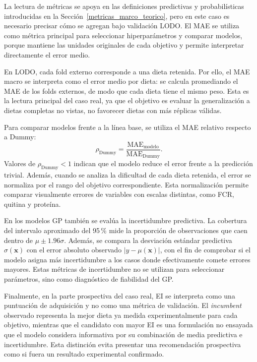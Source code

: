 La lectura de métricas se apoya en las definiciones predictivas y probabilísticas introducidas en la Sección~\ref{metricas_marco_teorico}, pero en este caso es necesario precisar cómo se agregan bajo validación LODO. El MAE se utiliza como métrica principal para seleccionar hiperparámetros y comparar modelos, porque mantiene las unidades originales de cada objetivo y permite interpretar directamente el error medio.

En LODO, cada fold externo corresponde a una dieta retenida. Por ello, el MAE macro se interpreta como el error medio por dieta: se calcula promediando el MAE de los folds externos, de modo que cada dieta tiene el mismo peso. Esta es la lectura principal del caso real, ya que el objetivo es evaluar la generalización a dietas completas no vistas, no favorecer dietas con más réplicas válidas.

Para comparar modelos frente a la línea base, se utiliza el MAE relativo respecto a Dummy:
\[
\rho_{\mathrm{Dummy}} = \frac{\mathrm{MAE}_{\mathrm{modelo}}}{\mathrm{MAE}_{\mathrm{Dummy}}}.
\]
Valores de \(\rho_{\mathrm{Dummy}}<1\) indican que el modelo reduce el error frente a la predicción trivial. Además, cuando se analiza la dificultad de cada dieta retenida, el error se normaliza por el rango del objetivo correspondiente. Esta normalización permite comparar visualmente errores de variables con escalas distintas, como FCR, quitina y proteína.

En los modelos GP también se evalúa la incertidumbre predictiva. La cobertura del intervalo aproximado del 95\,\% mide la proporción de observaciones que caen dentro de \(\mu \pm 1.96\sigma\). Además, se compara la desviación estándar predictiva \(\sigma(\bm{x})\) con el error absoluto observado \(|y-\mu(\bm{x})|\), con el fin de comprobar si el modelo asigna más incertidumbre a los casos donde efectivamente comete errores mayores. Estas métricas de incertidumbre no se utilizan para seleccionar parámetros, sino como diagnóstico de fiabilidad del GP.

Finalmente, en la parte prospectiva del caso real, EI se interpreta como una puntuación de adquisición y no como una métrica de validación. El \emph{incumbent} observado representa la mejor dieta ya medida experimentalmente para cada objetivo, mientras que el candidato con mayor EI es una formulación no ensayada que el modelo considera informativa por su combinación de media predictiva e incertidumbre. Esta distinción evita presentar una recomendación prospectiva como si fuera un resultado experimental confirmado.

